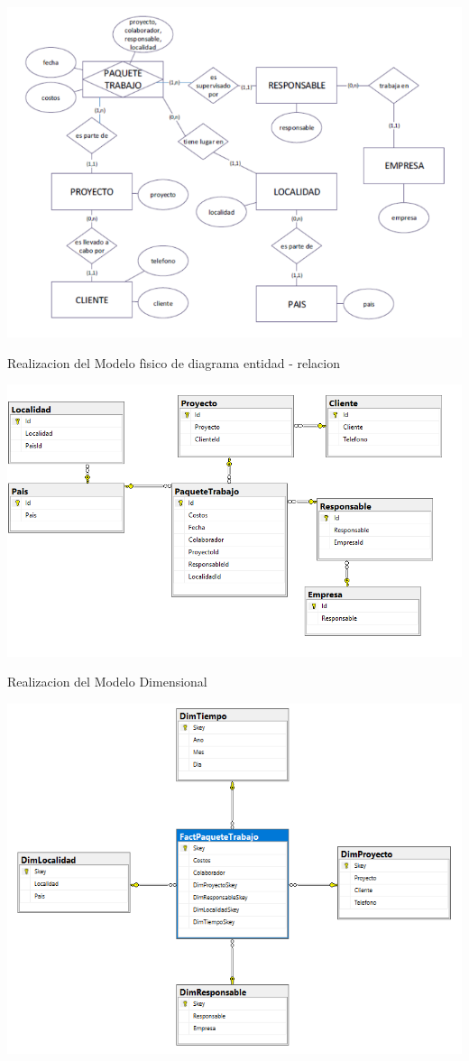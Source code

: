 \begin{itemize}
\begin{center}
\includegraphics[width=16cm]{./Imagenes/tarea3.png}
\end{center}

Realizacion del Modelo fìsico de diagrama entidad - relacion

\begin{center}
\includegraphics[width=15cm]{./Imagenes/tarea333.png}
\end{center}

 Realizacion del Modelo Dimensional 
\begin{center}
\includegraphics[width=14cm]{./Imagenes/tarea33.png}
\end{center}



\end{itemize}
